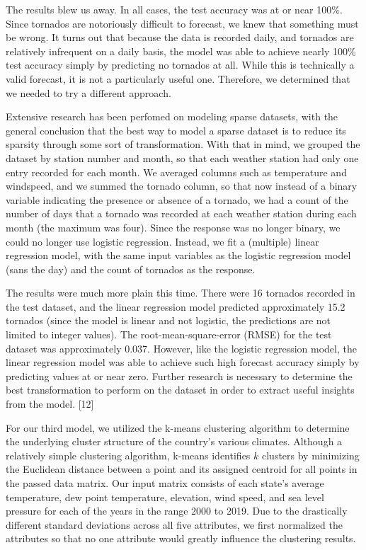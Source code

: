 \documentclass[conference]{IEEEtran}
\begin{document}
The results blew us away. In all cases, the test accuracy was at or near 100\%. Since tornados are notoriously difficult to forecast, we knew that something must be wrong. It turns out that because the data is recorded daily, and tornados are relatively infrequent on a daily basis, the model was able to achieve nearly 100\% test accuracy simply by predicting no tornados at all. While this is technically a valid forecast, it is not a particularly useful one. Therefore, we determined that we needed to try a different approach.

Extensive research has been perfomed on modeling sparse datasets, with the general conclusion that the best way to model a sparse dataset is to reduce its sparsity through some sort of transformation. With that in mind, we grouped the dataset by station number and month, so that each weather station had only one entry recorded for each month. We averaged columns such as temperature and windspeed, and we summed the tornado column, so that now instead of a binary variable indicating the presence or absence of a tornado, we had a count of the number of days that a tornado was recorded at each weather station during each month (the maximum was four). Since the response was no longer binary, we could no longer use logistic regression. Instead, we fit a (multiple) linear regression model, with the same input variables as the logistic regression model (sans the day) and the count of tornados as the response.

The results were much more plain this time. There were 16 tornados recorded in the test dataset, and the linear regression model predicted approximately 15.2 tornados (since the model is linear and not logistic, the predictions are not limited to integer values). The root-mean-square-error (RMSE) for the test dataset was approximately 0.037. However, like the logistic regression model, the linear regression model was able to achieve such high forecast accuracy simply by predicting values at or near zero. Further research is necessary to determine the best transformation to perform on the dataset in order to extract useful insights from the model. [12]

For our third model, we utilized the k-means clustering algorithm to determine the underlying cluster structure of the country's various climates. Although a relatively simple clustering algorithm, k-means identifies $k$ clusters by minimizing the Euclidean distance between a point and its assigned centroid for all points in the passed data matrix. Our input matrix consists of each state's average temperature, dew point temperature, elevation, wind speed, and sea level pressure for each of the years in the range 2000 to 2019. Due to the drastically different standard deviations across all five attributes, we first normalized the attributes so that no one attribute would greatly influence the clustering results.
\end{document}

